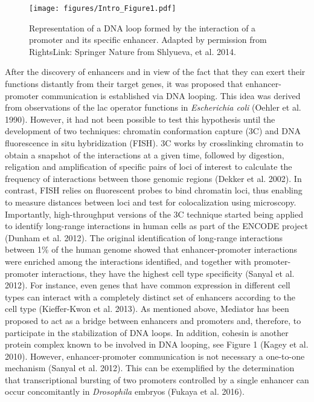 		\begin{figure}[h!]
			\centering
			\texttt{[image: figures/Intro\_Figure1.pdf]}
  			\caption[intro1]{Representation of a DNA loop formed by the interaction of a promoter and its specific enhancer. Adapted by permission from RightsLink: Springer Nature from Shlyueva, et al. 2014.}
			\label{intro1}
		\end{figure}


After the discovery of enhancers and in view of the fact that they can exert their functions distantly from their target genes, it was proposed that enhancer-promoter communication is established via DNA looping. This idea was derived from observations of the lac operator functions in \textit{Escherichia coli} (Oehler et al. 1990). However, it had not been possible to test this hypothesis until the development of two techniques: chromatin conformation capture (3C) and DNA fluorescence in situ hybridization (FISH). 3C works by crosslinking chromatin to obtain a snapshot of the interactions at a given time, followed by digestion, religation and amplification of specific pairs of loci of interest to calculate the frequency of interactions between those genomic regions (Dekker et al. 2002). In contrast, FISH relies on fluorescent probes to bind chromatin loci, thus enabling to measure distances between loci and test for colocalization using microscopy. Importantly, high-throughput versions of the 3C technique started being applied to identify long-range interactions in human cells as part of the ENCODE project (Dunham et al. 2012). The original identification of long-range interactions between 1\% of the human genome showed that enhancer-promoter interactions were enriched among the interactions identified, and together with promoter-promoter interactions, they have the highest cell type specificity (Sanyal et al. 2012). For instance, even genes that have common expression in different cell types can interact with a completely distinct set of enhancers according to the cell type (Kieffer-Kwon et al. 2013). As mentioned above, Mediator has been proposed to act as a bridge between enhancers and promoters and, therefore, to participate in the stabilization of DNA loops. In addition, cohesin is another protein complex known to be involved in DNA looping, see Figure 1 (Kagey et al. 2010). However, enhancer-promoter communication is not necessary a one-to-one mechanism (Sanyal et al. 2012). This can be exemplified by the determination that transcriptional bursting of two promoters controlled by a single enhancer can occur concomitantly in \textit{Drosophila} embryos (Fukaya et al. 2016).\\


